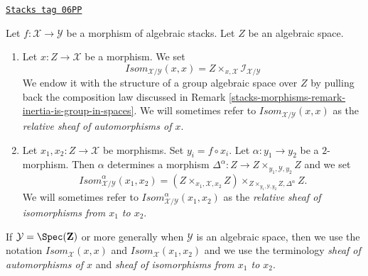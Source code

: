 \begin{definition}[Isom]
\label{stacks-morphisms-definition-isom}
\href{https://stacks.math.columbia.edu/tag/06PP}{\texttt{Stacks tag 06PP}}

Let $f : \mathcal{X} \to \mathcal{Y}$ be a morphism of algebraic stacks.
Let $Z$ be an algebraic space.
\begin{enumerate}
\item Let $x : Z \to \mathcal{X}$ be a morphism. We set
$$
\mathit{Isom}_{\mathcal{X}/\mathcal{Y}}(x, x) =
Z \times_{x, \mathcal{X}} \mathcal{I}_{\mathcal{X}/\mathcal{Y}}
$$
We endow it with the structure of a group algebraic space over $Z$
by pulling back the composition law discussed in
Remark \ref{stacks-morphisms-remark-inertia-is-group-in-spaces}.
We will sometimes refer to $\mathit{Isom}_{\mathcal{X}/\mathcal{Y}}(x, x)$
as the {\it relative sheaf of automorphisms of $x$}.
\item Let $x_1, x_2 : Z \to \mathcal{X}$ be morphisms. Set
$y_i = f \circ x_i$. Let $\alpha : y_1 \to y_2$ be a $2$-morphism.
Then $\alpha$ determines a morphism
$\Delta^\alpha : Z \to Z \times_{y_1, \mathcal{Y}, y_2} Z$ and we set
$$
\mathit{Isom}_{\mathcal{X}/\mathcal{Y}}^\alpha(x_1, x_2) =
(Z \times_{x_1, \mathcal{X}, x_2} Z)
\times_{Z \times_{y_1, \mathcal{Y}, y_2} Z, \Delta^\alpha} Z.
$$
We will sometimes refer to
$\mathit{Isom}_{\mathcal{X}/\mathcal{Y}}^\alpha(x_1, x_2)$
as the {\it relative sheaf of isomorphisms from $x_1$ to $x_2$}.
\end{enumerate}
If $\mathcal{Y} = \Spec(\mathbf{Z})$ or more generally when $\mathcal{Y}$
is an algebraic space, then we use the notation
$\mathit{Isom}_\mathcal{X}(x, x)$ and $\mathit{Isom}_\mathcal{X}(x_1, x_2)$
and we use the terminology {\it sheaf of automorphisms of $x$}
and {\it sheaf of isomorphisms from $x_1$ to $x_2$}.
\end{definition}

